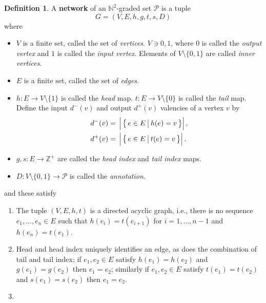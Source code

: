 \documentclass{article}
\makeatletter
\newcommand{\N}{\mathbb{N}}
\newcommand{\Z}{\mathbb{Z}}
\newcommand{\Zp}{\Z^+}
\newcommand{\Fpil}{\longrightarrow}
\newcommand{\mc}{\mathcal}
\newcommand*{\norm}[2][\@gobble]{\left|#1. #2 \right|}
\newcommand*{\setOf}[3][\@gobble]{%
   \left\{ \, #2 \,\,\vrule\relax#1.\,\, #3 \, \right\}%
}
\theoremstyle{definition}
\newtheorem{definition}{Definition}
\providecommand*{\DefOrd}[2][]{\textbf{#2}}
\providecommand*{\emDefOrd}[2][]{\emph{#2}}
\makeatother
\begin{document}
\begin{definition} \label{Def:Network}
  A \DefOrd{network} of an $\N^2$-graded set $\mc{P}$ is a tuple
  \begin{equation}
    G = (V,E,h,g,t,s,D)
  \end{equation}
  where
  \begin{itemize}
    \item
      $V$ is a finite set, called the set of \emDefOrd{vertices}. \(V 
      \owns 0,1\), where $0$ is called the \emDefOrd{output vertex} 
      and $1$ is called the \emDefOrd{input vertex}. Elements of \(V 
      \setminus \{0,1\}\) are called \emDefOrd{inner vertices}.
    \item
      $E$ is a finite set, called the set of \emDefOrd{edges}.
    \item
      \(h\colon E \Fpil V \setminus \{1\}\) is called the 
      \emDefOrd{head} map. \(t\colon E \Fpil V \setminus \{0\}\) is 
      called the \emDefOrd{tail} map. Define the input $d^-(v)$ and 
      output $d^+(v)$ valencies of a vertex $v$ by
      \begin{align*}
        d^-(v) ={}& 
          \norm[\Big]{ \setOf[\big]{ e \in E }{ h(e) = v } }
          \text{,}\\
        d^+(v) ={}& 
          \norm[\Big]{ \setOf[\big]{ e \in E }{ t(e) = v } }
          \text{.}
      \end{align*}
    \item
      \(g,s\colon E \Fpil \Zp\) are 
      called the \emDefOrd{head index} and \emDefOrd{tail index} 
      maps.
    \item
      \(D\colon V \setminus \{0,1\} \Fpil \mc{P}\) is called the 
      \emDefOrd{annotation}.
  \end{itemize}
  and these satisfy
  \begin{enumerate}
    \item \label{A1:Network}
      The tuple $(V,E,h,t)$ is a directed acyclic graph, i.e., there 
      is no sequence \(e_1,\dotsc,e_n \in E\) such that 
      \(h(e_i)=t(e_{i+1})\) for \(i=1,\dotsc,n-1\) and 
      \(h(e_n)=t(e_1)\).
    \item \label{A2:Network}
      Head and head index uniquely identifies an edge, as does the 
      combination of tail and tail index; if \(e_1,e_2 \in E\) satisfy 
      \(h(e_1)=h(e_2)\) and \(g(e_1) = g(e_2)\) then \(e_1=e_2\); 
      similarly if \(e_1,e_2 \in E\) satisfy \(t(e_1)=t(e_2)\) and 
      \(s(e_1) = s(e_2)\) then \(e_1=e_2\).
    \item \label{A3:Network}

\end{enumerate}
\end{definition}
\end{document}
